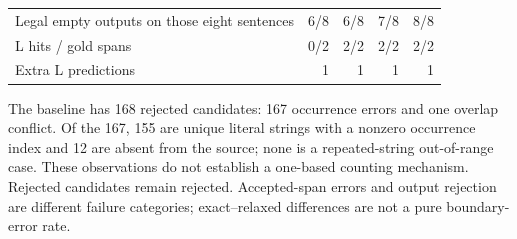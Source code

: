 \begin{table}[H]
\begin{tabularx}{\linewidth}{@{}Lrrrr@{}}
Legal empty outputs on those eight sentences & 6/8 & 6/8 & 7/8 & 8/8 \\
L hits / gold spans & 0/2 & 2/2 & 2/2 & 2/2 \\
Extra L predictions & 1 & 1 & 1 & 1 \\
\bottomrule
\end{tabularx}
\par\smallskip\RaggedRight
The baseline has 168 rejected candidates: 167 occurrence errors and one overlap conflict. Of the 167, 155 are unique literal strings with a nonzero occurrence index and 12 are absent from the source; none is a repeated-string out-of-range case. These observations do not establish a one-based counting mechanism. Rejected candidates remain rejected. Accepted-span errors and output rejection are different failure categories; exact--relaxed differences are not a pure boundary-error rate.
\end{table}
